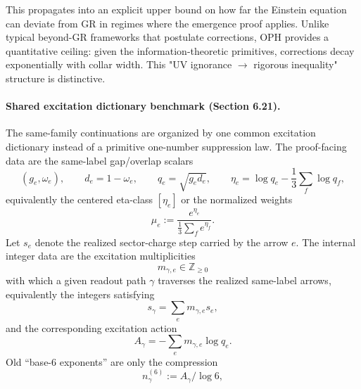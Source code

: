 This propagates into an explicit upper bound on how far the Einstein equation can deviate from GR in regimes where the emergence proof applies. Unlike typical beyond-GR frameworks that postulate corrections, OPH provides a quantitative ceiling: given the information-theoretic primitives, corrections decay exponentially with collar width. This "UV ignorance \ensuremath{\to} rigorous inequality" structure is distinctive.

\paragraph{Shared excitation dictionary benchmark (Section 6.21).} The same-family continuations are organized by one common excitation dictionary instead of a primitive one-number suppression law. The proof-facing data are the same-label gap/overlap scalars
\[
(g_e,\omega_e),\qquad
d_e=1-\omega_e,\qquad
q_e=\sqrt{g_e d_e},\qquad
\eta_e=\log q_e-\frac13\sum_f \log q_f,
\]
equivalently the centered eta-class \([\eta_e]\) or the normalized weights
\[
\mu_e:=\frac{e^{\eta_e}}{\frac13\sum_f e^{\eta_f}}.
\]
Let \(s_e\) denote the realized sector-charge step carried by the arrow \(e\).
The internal integer data are the excitation multiplicities
\[
m_{\gamma,e}\in\mathbb Z_{\ge0}
\]
with which a given readout path \(\gamma\) traverses the realized same-label arrows, equivalently the integers satisfying
\[
s_\gamma=\sum_e m_{\gamma,e}s_e,
\]
and the corresponding excitation action
\[
A_\gamma=-\sum_e m_{\gamma,e}\log q_e.
\]
Old ``base-6 exponents'' are only the compression
\[
n_\gamma^{(6)}:=A_\gamma/\log 6,
\]
